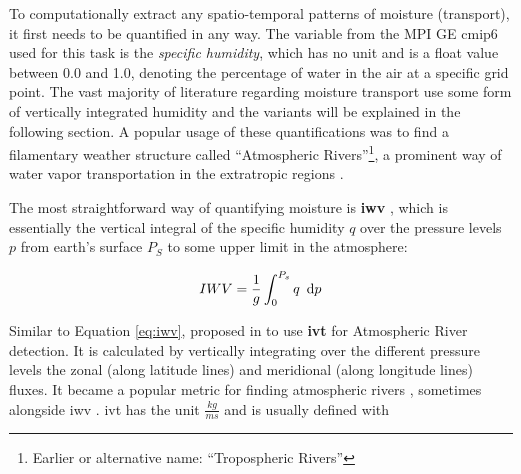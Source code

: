 To computationally extract any spatio-temporal patterns of moisture (transport), it first needs to be quantified in any way.
The variable from the MPI GE \ac{cmip}6 used for this task is the \textit{specific humidity}, which has no unit and is a float value between 0.0 and 1.0, denoting the percentage of water in the air at a specific grid point. 
The vast majority of literature regarding moisture transport use some form of vertically integrated humidity and the variants will be explained in the following section.  
A popular usage of these quantifications was to find a filamentary weather structure called \enquote{Atmospheric Rivers}\footnote{Earlier or alternative name: \enquote{Tropospheric Rivers}}, a prominent way of water vapor transportation in the extratropic regions \cite{gimeno_atmospheric_2014}. 


The most straightforward way of quantifying moisture is \textbf{\ac{iwv}} \cite{gimeno_atmospheric_2014, schluessel_atmospheric_1990, bao_interpretation_2006, neiman_meteorological_2008, zhao_lagrangian_2021}, which is essentially the vertical integral of the specific humidity $q$ over the pressure levels $p$ from earth's surface $P_S$ to some upper limit in the atmosphere:


\begin{equation}
\label{eq:iwv}
IWV = \frac{1}{g} \int^{P_s}_0 q ~\operatorname{d}\!{p}
\end{equation}






Similar to Equation \ref{eq:iwv},  \citeauthor{zhu_proposed_1998} proposed in \cite{zhu_proposed_1998} to use \textbf{\ac{ivt}} for Atmospheric River detection. 
It is calculated by vertically integrating over the different pressure levels the zonal (along latitude lines) and meridional (along longitude lines) fluxes.
It became a popular metric for finding atmospheric rivers \cite{gimeno_atmospheric_2014}, sometimes alongside \ac{iwv} \cite{eiras-barca_seasonal_2016}.
\ac{ivt} has the unit $\frac{kg}{ms}$ and is usually defined with

